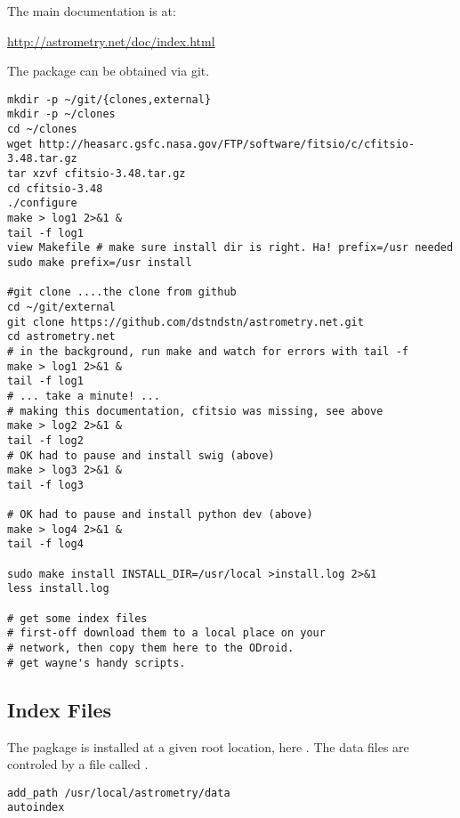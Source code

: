 \documentclass[letter,11pt,oneside]{article}
\newcommand{\dhl}[1]{{\color{verbcolor}{\texttt#1}}}
\begin{document}
The main documentation is at: 

\url{http://astrometry.net/doc/index.html}

The \dhl{Astrometry.net} package can be obtained via git.

\begin{tcolorbox} %
\begingroup \fontsize{10pt}{10pt}
\selectfont
\begin{verbatim} 
mkdir -p ~/git/{clones,external}
mkdir -p ~/clones
cd ~/clones
wget http://heasarc.gsfc.nasa.gov/FTP/software/fitsio/c/cfitsio-3.48.tar.gz
tar xzvf cfitsio-3.48.tar.gz
cd cfitsio-3.48
./configure
make > log1 2>&1 &
tail -f log1
view Makefile # make sure install dir is right. Ha! prefix=/usr needed
sudo make prefix=/usr install

#git clone ....the clone from github
cd ~/git/external
git clone https://github.com/dstndstn/astrometry.net.git
cd astrometry.net
# in the background, run make and watch for errors with tail -f
make > log1 2>&1 &
tail -f log1
# ... take a minute! ...
# making this documentation, cfitsio was missing, see above
make > log2 2>&1 &
tail -f log2
# OK had to pause and install swig (above)
make > log3 2>&1 &
tail -f log3

# OK had to pause and install python dev (above)
make > log4 2>&1 &
tail -f log4

sudo make install INSTALL_DIR=/usr/local >install.log 2>&1
less install.log

# get some index files
# first-off download them to a local place on your
# network, then copy them here to the ODroid.
# get wayne's handy scripts.
\end{verbatim}
\endgroup
\end{tcolorbox}

\subsection{Index Files}

The pagkage is installed at a given root location, here
\dhl{/usr/local/share/astrometry}. The
data files are controled by a file called \dhl{etc/astrometry.cfg}.

\begin{tcolorbox} %
\begingroup \fontsize{10pt}{10pt}
\selectfont
\begin{verbatim} 
add_path /usr/local/astrometry/data
autoindex
\end{verbatim}
\endgroup
\end{tcolorbox}
\end{document}
